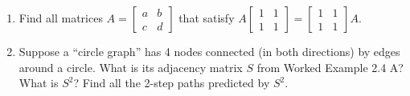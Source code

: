 \documentclass[14pt, a4paper]{article}
\begin{document}
\begin{enumerate}[resume]
    \item Find all matrices $A = \begin{bmatrix} a & b \\ c & d \end{bmatrix}$ that satisfy $A\begin{bmatrix} 1 & 1 \\ 1 & 1 \end{bmatrix} = \begin{bmatrix} 1 & 1 \\ 1 & 1 \end{bmatrix}A$.

    \item Suppose a ``circle graph'' has 4 nodes connected (in both directions) by edges around a circle. What is its adjacency matrix $S$ from Worked Example 2.4 A? What is $S^2$? Find all the 2-step paths predicted by $S^2$.

\end{enumerate}
\end{document}
